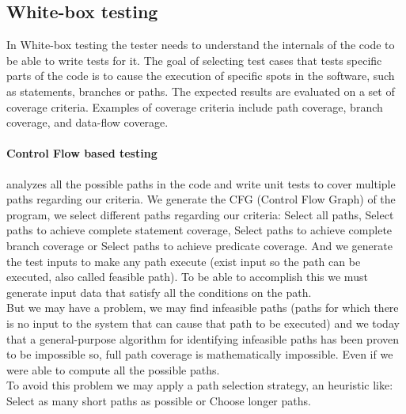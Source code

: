 \documentclass[citeauthoryear]{llncs}
\begin{document}
\subsection{White-box testing}
In White-box testing the tester needs to understand the internals of the code to be able to write tests for it.
The goal of selecting test cases that tests specific parts of the code is to cause the execution of specific spots in the software, such as statements, branches or
paths. The expected results are evaluated on a set of coverage criteria. Examples of coverage criteria include path coverage, branch coverage, and data-flow coverage.
\paragraph{Control Flow based testing} analyzes all the possible paths in the code and write unit tests to cover multiple paths regarding our criteria.
We generate the CFG (Control Flow Graph) of the program, we select different paths regarding our criteria:
Select all paths, Select paths to achieve complete statement coverage\cite{stt,Ntafos:1988:CST:630792.631017},
Select paths to achieve complete branch coverage\cite{Roper1994,stt}
or Select paths to achieve predicate coverage\cite{stt,Ntafos:1988:CST:630792.631017}.
And we generate the test inputs to make any path execute (exist input so the path can be executed, also called feasible path).
To be able to accomplish this we must generate input data that satisfy all the conditions on the path.\\
But we may have a problem, we may find infeasible paths (paths for which there is no input to the system that can cause that path to be executed)
and we today that a general-purpose algorithm for identifying infeasible paths has been proven to be impossible\cite{infeasible} so, full path coverage
is mathematically impossible. Even if we were able to compute all the possible paths.\\
To avoid this problem we may apply a path selection strategy, an heuristic like: Select as many short paths as possible or Choose longer paths.
\end{document}
